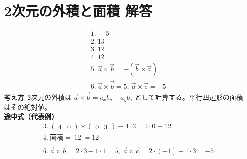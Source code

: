 \documentclass[paper=b4j,landscape,twocolumn,fleqn]{jlreq}
\begin{document}
\section{2次元の外積と面積 解答}
\begin{align*}
&1.\ -5\\[0.45em]
&2.\ 13\\[0.45em]
&3.\ 12\\[0.45em]
&4.\ 12\\[0.45em]
&5.\ \vec{a}\times\vec{b}=-(\vec{b}\times\vec{a})\\[0.45em]
&6.\ \vec{a}\times\vec{b}=5,\ \vec{a}\times\vec{c}=-5
\end{align*}
\textbf{考え方}\
2次元の外積は $\vec{a}\times\vec{b}=a_xb_y-a_yb_x$ として計算する。平行四辺形の面積はその絶対値。\\
\textbf{途中式（代表例）}
\begin{align*}
&3.\ \begin{pmatrix}4 & 0\end{pmatrix}\times\begin{pmatrix}0 & 3\end{pmatrix}=4\cdot3-0\cdot0=12\\
&4.\ \text{面積}=|12|=12\\
&6.\ \vec{a}\times\vec{b}=2\cdot3-1\cdot1=5,\ \vec{a}\times\vec{c}=2\cdot(-1)-1\cdot3=-5
\end{align*}

\newpage
\end{document}
